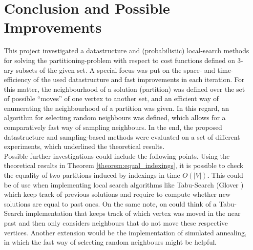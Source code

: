 \section{Conclusion and Possible Improvements}
This project investigated a datastructure and (probabilistic) local-search methods for solving the partitioning-problem with respect to cost functions defined on 3-ary subsets of the given set. A special focus was put on the space- and time-efficiency of the used datastructure and fast improvements in each iteration. For this matter, the neighbourhood of a solution (partition) was defined over the set of possible ``moves'' of one vertex to another set, and an efficient way of enumerating the neighbourhood of a partition was given. In this regard, an algorithm for selecting random neighbours was defined, which allows for a comparatively fast way of sampling neighbours. In the end, the proposed datastructure and sampling-based methods were evaluated on a set of different experiments, which underlined the theoretical results. 
\\
Possible further investigations could include the following points. Using the theoretical results in Theorem \ref{theorem:equal_indexings}, it is possible to check the equality of two partitions induced by indexings in time $O(|V|)$. This could be of use when implementing local search algorithms like Tabu-Search (Glover \cite{glover1986future}) which keep track of previous solutions and require to compute whether new solutions are equal to past ones. On the same note, on could think of a Tabu-Search implementation that keeps track of which vertex was moved in the near past and then only considers neighbours that do not move these respective vertices. Another extension would be the implementation of simulated annealing, in which the fast way of selecting random neighbours might be helpful.



